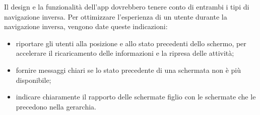 \documentclass[12pt, a4paper]{report}
\begin{document}
    		    Il design e la funzionalità dell’app dovrebbero tenere conto di entrambi i tipi di navigazione inversa. Per ottimizzare l'esperienza di un utente durante la navigazione inversa, vengono
    			date queste indicazioni:
    			\begin{itemize}
    				\item riportare gli utenti alla posizione e allo stato precedenti dello schermo, per accelerare il ricaricamento delle informazioni e la ripresa delle attività;
    				\item fornire messaggi chiari se lo stato precedente di una schermata non è più disponibile;
    				\item indicare chiaramente il rapporto delle schermate figlio con le schermate che le precedono nella gerarchia.
    			\end{itemize}
\end{document}
